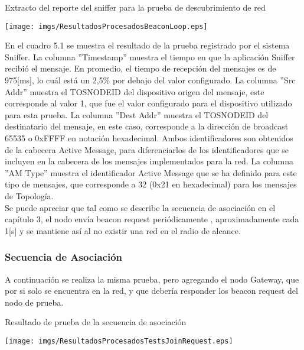 \begin{table}[H]
\centering
\caption{Extracto del reporte del sniffer para la prueba de descubrimiento de red}
 \texttt{[image: imgs/ResultadosProcesadosBeaconLoop.eps]}
\end{table}

En el cuadro 5.1 se muestra el resultado de la prueba registrado por el sistema Sniffer. La columna ''Timestamp'' muestra el tiempo en que la aplicación Sniffer recibió el mensaje. En promedio, el tiempo de recepción del mensajes es de 975[ms], lo cuál está un 2,5\% por debajo del valor configurado. La columna ''Src Addr'' muestra el TOS\textunderscore NODE\textunderscore ID del dispositivo origen del mensaje, este corresponde al valor 1, que fue el valor configurado para el dispositivo utilizado para esta prueba. La columna ''Dest Addr'' muestra el TOS\textunderscore NODE\textunderscore ID del destinatario del mensaje, en este caso, corresponde a la dirección de broadcast 65535 o 0xFFFF en notación hexadecimal. Ambos identificadores son obtenidos de la cabecera Active Message, para diferenciarlos de los identificadores que se incluyen en la cabecera de los mensajes implementados para la red. La columna ''AM Type'' muestra el identificador Active Message que se ha definido para este tipo de mensajes, que corresponde a 32 (0x21 en hexadecimal) para los mensajes de Topología.\\

Se puede apreciar que tal como se describe la secuencia de asociación en el capítulo 3, el nodo envía beacon request periódicamente , aproximadamente cada 1[s] y se mantiene así al no existir una red en el radio de alcance. 

\subsubsection{Secuencia de Asociación}
A continuación se realiza la misma prueba, pero agregando el nodo Gateway, que por si solo se encuentra en la red, y que debería responder los beacon request del nodo de prueba.

\begin{table}[H]
\centering
\caption{Resultado de prueba de la secuencia de asociación}
 \texttt{[image: imgs/ResultadosProcesadosTestsJoinRequest.eps]}
\end{table}

